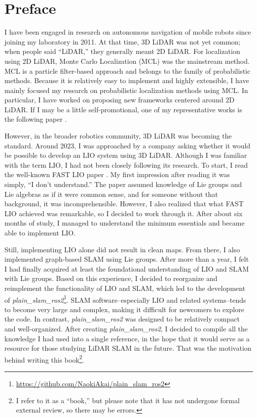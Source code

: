 \section*{Preface}

I have been engaged in research on autonomous navigation of mobile robots since joining my laboratory in 2011.
At that time, 3D LiDAR was not yet common; when people said ``LiDAR,'' they generally meant 2D LiDAR.
For localization using 2D LiDAR, Monte Carlo Localization (MCL) \cite{DellaertICRA1999} was the mainstream method.
MCL is a particle filter-based approach and belongs to the family of probabilistic methods.
Because it is relatively easy to implement and highly extensible, I have mainly focused my research on probabilistic localization methods using MCL.
In particular, I have worked on proposing new frameworks centered around 2D LiDAR.
If I may be a little self-promotional, one of my representative works is the following paper \cite{AkaiJFR2023}.

However, in the broader robotics community, 3D LiDAR was becoming the standard.
Around 2023, I was approached by a company asking whether it would be possible to develop an LIO system using 3D LiDAR.
Although I was familiar with the term LIO, I had not been closely following its research.
To start, I read the well-known FAST LIO paper \cite{FAST-LIO}.
My first impression after reading it was simply, ``I don't understand.''
The paper assumed knowledge of Lie groups and Lie algebras as if it were common sense, and for someone without that background, it was incomprehensible.
However, I also realized that what FAST LIO achieved was remarkable, so I decided to work through it.
After about six months of study, I managed to understand the minimum essentials and became able to implement LIO.

Still, implementing LIO alone did not result in clean maps.
From there, I also implemented graph-based SLAM using Lie groups.
After more than a year, I felt I had finally acquired at least the foundational understanding of LIO and SLAM with Lie groups.
Based on this experience, I decided to reorganize and reimplement the functionality of LIO and SLAM, which led to the development of {\it plain\_slam\_ros2}\footnote{\url{https://github.com/NaokiAkai/plain_slam_ros2}}.
SLAM software--especially LIO and related systems--tends to become very large and complex, making it difficult for newcomers to explore the code.
In contrast, {\it plain\_slam\_ros2} was designed to be relatively compact and well-organized.
After creating {\it plain\_slam\_ros2}, I decided to compile all the knowledge I had used into a single reference, in the hope that it would serve as a resource for those studying LiDAR SLAM in the future.
That was the motivation behind writing this book\footnote{I refer to it as a ``book,'' but please note that it has not undergone formal external review, so there may be errors.}.

